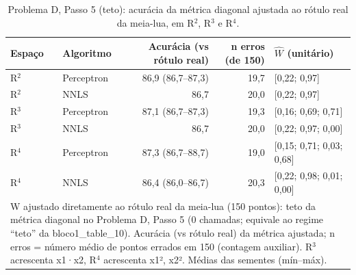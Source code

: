 \begin{table}[htbp]
\centering
\small
\caption{Problema D, Passo 5 (teto): acurácia da métrica diagonal ajustada ao rótulo real da meia-lua, em R$^2$, R$^3$ e R$^4$.}
\label{tab:bloco1_D_passo5_teto}
\begin{tabular}{llrrl}
\toprule
Espaço & Algoritmo & Acurácia (vs rótulo real) & n erros (de 150) & $\hat{W}$ (unitário) \\
\midrule
R$^2$ & Perceptron & 86,9 (86,7–87,3) & 19,7 & [0,22; 0,97] \\
R$^2$ & NNLS & 86,7 & 20,0 & [0,22; 0,97] \\
R$^3$ & Perceptron & 87,1 (86,7–87,3) & 19,3 & [0,16; 0,69; 0,71] \\
R$^3$ & NNLS & 86,7 & 20,0 & [0,22; 0,97; 0,00] \\
R$^4$ & Perceptron & 87,3 (86,7–88,7) & 19,0 & [0,15; 0,71; 0,03; 0,68] \\
R$^4$ & NNLS & 86,4 (86,0–86,7) & 20,3 & [0,22; 0,98; 0,01; 0,00] \\
\bottomrule
\multicolumn{5}{p{0.95\linewidth}}{\footnotesize W ajustado diretamente ao rótulo real da meia-lua (150 pontos): teto da métrica diagonal no Problema D, Passo 5 (0 chamadas; equivale ao regime ``teto'' da bloco1\_table\_10). Acurácia (vs rótulo real) da métrica ajustada; n erros = número médio de pontos errados em 150 (contagem auxiliar). R$^3$ acrescenta x1·x2, R$^4$ acrescenta x1², x2². Médias das sementes (mín–máx).} \\
\end{tabular}
\end{table}
